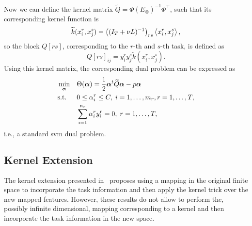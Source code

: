 Now we can define the kernel matrix $\widetilde{Q} = \Phi (E_\otimes)^{-1} \Phi^\intercal$, such that its corresponding kernel function is
\begin{equation}
    \label{eq:kernelfun_gl}
    \widetilde{k}(x_i^r, x_j^s) =  \left((I_T + \nu L)^{-1}\right)_{rs} \dotp{x_i^r}{x_j^s},
\end{equation}
so the block $Q[{rs}]$, corresponding to the $r$-th and $s$-th task, is defined as
$$ Q[{rs}]_{ij} = y_i^r y_j^s \widetilde{k}(x_i^r, x_j^s) .$$
Using this kernel matrix, the corresponding dual problem can be expressed as
\begin{equation}\label{eq:linear_gl_dual}
    \begin{aligned}
         & \min_{\fv{\alpha}}
         &                       & \Theta(\fv{\alpha}) = \frac{1}{2} \fv{\alpha}^t \widetilde{Q} \fv{\alpha} - p \fv{\alpha}                                                             \\
         & \text{s.t.}
         &                       & 0 \leq \alpha_i^r \leq C, \;  i=1,\ldots,m_r, r=1,\ldots,T ,                                                                                          \\
         &                       &                                                                                           & \sum_{i=1}^{n_r}{\alpha_i^r y_i^r} = 0, \; r=1,\ldots,T ,
    \end{aligned}
\end{equation}
i.e., a standard \acrshort{svm} dual problem.

\subsection{Kernel Extension}

The kernel extension presented in~\cite{EvgeniouMP05} proposes using a mapping in the original finite space to incorporate the task information and then apply the kernel trick over the new mapped features. However, these results do not allow to perform the, possibly infinite dimensional, mapping corresponding to a kernel and then incorporate the task information in the new space.

